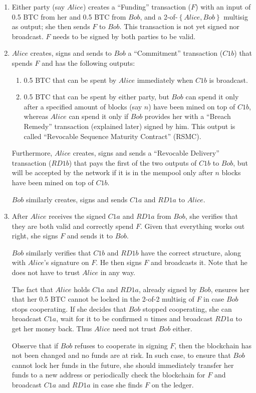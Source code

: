     \begin{enumerate}
      \item Either party (say $Alice$) creates a ``Funding'' transaction ($F$) with an input
      of 0.5 BTC from her and 0.5 BTC from $Bob$, and a 2-of-$\left\{Alice, Bob\right\}$
      multisig as output; she then sends $F$ to $Bob$. This transaction is not yet signed
      nor broadcast. $F$ needs to be signed by both parties to be valid.

      \item $Alice$ creates, signs and sends to $Bob$ a ``Commitment'' transaction ($C1b$)
      that spends $F$ and has the following outputs:
      \begin{enumerate}
        \item 0.5 BTC that can be spent by $Alice$ immediately when $C1b$ is broadcast.
        \item 0.5 BTC that can be spent by either party, but $Bob$ can spend it only after
        a specified amount of blocks (say $n$) have been mined on top of $C1b$, whereas
        $Alice$ can spend it only if $Bob$ provides her with a ``Breach Remedy'' transaction
        (explained later) signed by him. This output is called ``Revocable Sequence
        Maturity Contract'' (RSMC).
      \end{enumerate}
      Furthermore, $Alice$ creates, signs and sends a ``Revocable Delivery'' transaction
      ($RD1b$) that pays the first of the two outputs of $C1b$ to $Bob$, but will be
      accepted by the network if it is in the mempool only after $n$ blocks have been
      mined on top of $C1b$.

      $Bob$ similarly creates, signs and sends $C1a$ and $RD1a$ to $Alice$.

      \item After $Alice$ receives the signed $C1a$ and $RD1a$ from $Bob$, she verifies
      that they are both valid and correctly spend $F$. Given that everything works out
      right, she signs $F$ and sends it to $Bob$.

      $Bob$ similarly verifies that $C1b$ and $RD1b$ have the correct structure, along
      with $Alice$'s signature on $F$. He then signs $F$ and broadcasts it. Note that he
      does not have to trust $Alice$ in any way.

      The fact that $Alice$ holds $C1a$ and $RD1a$, already signed by $Bob$, ensures her
      that her 0.5 BTC cannot be locked in the 2-of-2 multisig of $F$ in case $Bob$ stops
      cooperating. If she decides that $Bob$ stopped cooperating, she can broadcast $C1a$,
      wait for it to be confirmed $n$ times and broadcast $RD1a$ to get her money back.
      Thus $Alice$ need not trust $Bob$ either.

      Observe that if $Bob$ refuses to cooperate in signing $F$, then the blockchain has
      not been changed and no funds are at risk. In such case, to ensure that $Bob$ cannot
      lock her funds in the future, she should immediately transfer her funds to a new
      address or periodically check the blockchain for $F$ and broadcast $C1a$ and $RD1a$
      in case she finds $F$ on the ledger.

    \end{enumerate}

